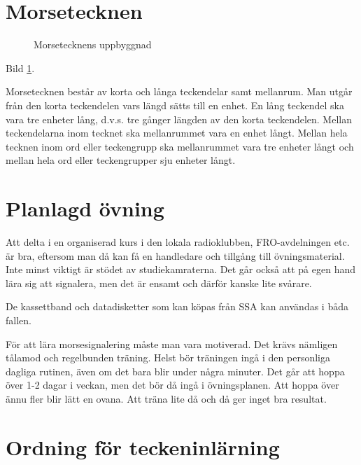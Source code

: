 \section{Morsetecknen}

\begin{figure}
  \caption{Morsetecknens uppbyggnad}
  \label{fig:bild_morse_1}
\end{figure}

Bild \ref{fig:bild_morse_1}.

Morsetecknen består av korta och långa teckendelar samt mellanrum. Man utgår från
den korta teckendelen vars längd sätts till en enhet. En lång teckendel ska
vara tre enheter lång, d.v.s. tre gånger längden av den korta
teckendelen. Mellan teckendelarna inom tecknet ska mellanrummet vara en enhet
långt. Mellan hela tecknen inom ord eller teckengrupp ska mellanrummet vara
tre enheter långt och mellan hela ord eller teckengrupper sju enheter långt.

\section{Planlagd övning}

Att delta i en organiserad kurs i den lokala radioklubben, FRO-avdelningen etc.
är bra, eftersom man då kan få en handledare och tillgång till övningsmaterial.
Inte minst viktigt är stödet av studiekamraterna. Det går också att på egen hand
lära sig att signalera, men det är ensamt och därför kanske lite svårare.
\begin{rev-omarbetas}
De kassettband och datadisketter som kan köpas från SSA kan användas i båda fallen.
\end{rev-omarbetas}

För att lära morsesignalering måste man vara motiverad. Det krävs nämligen
tålamod och regelbunden träning. Helst bör träningen ingå i den personliga dagliga
rutinen, även om det bara blir under några minuter. Det går att hoppa över 1-2
dagar i veckan, men det bör då ingå i övningsplanen. Att hoppa över ännu fler
blir lätt en ovana. Att träna lite då och då ger inget bra resultat.

\section{Ordning för teckeninlärning}

